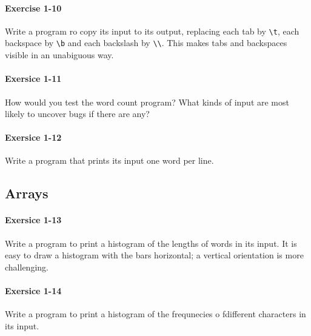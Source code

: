 		\paragraph{Exercise 1-10}
			Write a program ro copy its input to its output, replacing each tab by
			\lstinline{\t}, each backspace by \lstinline{\b} and each backslash by
			\lstinline{\\}. This makes tabs and backspaces visible in an unabiguous
			way.

			\hfill{}\cite[p.~20]{knr}
			

		\paragraph{Exersice 1-11}
			How would you test the word count program? What kinds of input are
			most likely to uncover bugs if there are any?

			\hfill{}\cite[p.~21]{knr}

		\paragraph{Exersice 1-12}
			Write a program that prints its input one word per line.
			
			\hfill{}\cite[p.~21]{knr}

			

	\newpage
	\subsection{Arrays}
		\paragraph{Exersice 1-13}
			Write a program to print a histogram of the lengths of words in
			its input. It is easy to draw a histogram with the bars horizontal;
			a vertical orientation is more challenging.
	
			\hfill{}\cite[p.~24]{knr}

			

		\paragraph{Exersice 1-14}
			Write a program to print a histogram of the frequnecies o fdifferent
			characters in its input.
	
